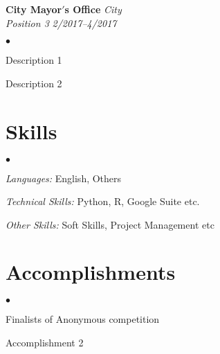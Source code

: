 \documentclass[margin,line]{res}
\newenvironment{list2}{
  \begin{list}{$\bullet$}{%
      \setlength{\itemsep}{0in}
      \setlength{\parsep}{0in} \setlength{\parskip}{0in}
      \setlength{\topsep}{0in} \setlength{\partopsep}{0in}
      \setlength{\leftmargin}{0.15in}}}{\end{list}}
\begin{document}
\begin{resume}
{\bf City Mayor$'$s Office}
\hfill{\emph{City}}\\

\vspace{-.8cm}
{\em Position 3} \hfill{\emph{2/2017--4/2017}}\\
\vspace{-.4cm}
\begin{list2}
\item Description 1
\item Description 2 
\end{list2}

\section{\sc Skills}
\begin{list2}

\item \emph{Languages:} English, Others
\item \emph{Technical Skills:} Python, R, Google Suite etc.
\item \emph{Other Skills:} Soft Skills, Project Management etc

\end{list2}

\section{\sc Accomplishments}

\begin{list2}

\item Finalists of Anonymous competition
\item Accomplishment 2

\end{list2}

\end{resume}
\end{document}
